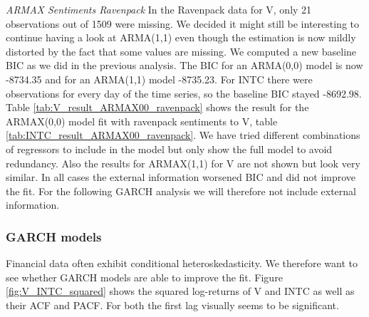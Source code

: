 \textit{ARMAX Sentiments Ravenpack}
In the Ravenpack data for V, only 21 observations out of 1509 were missing. We decided it might still be interesting to continue having a look at ARMA(1,1) even though the estimation is now mildly distorted by the fact that some values are missing. We computed a new baseline BIC as we did in the previous analysis. The BIC for an ARMA(0,0) model is now -8734.35 and for an ARMA(1,1) model -8735.23. For INTC there were observations for every day of the time series, so the baseline BIC stayed -8692.98. Table \ref{tab:V_result_ARMAX00_ravenpack} shows the result for the ARMAX(0,0) model fit with ravenpack sentiments to V, table \ref{tab:INTC_result_ARMAX00_ravenpack}. We have tried different combinations of regressors to include in the model but only show the full model to avoid redundancy. Also the results for ARMAX(1,1) for V are not shown but look very similar. In all cases the external information worsened BIC and did not improve the fit. For the following GARCH analysis we will therefore not include external information. 

\begin{table}[h]
    \centering
    
    \caption{}
    \label{tab:V_result_ARMAX00_ravenpack}
\end{table}{}

\begin{table}[h]
    \centering
    
    \caption{}
    \label{tab:V_result_ARMAX00_sentiment}
\end{table}{}

\begin{table}[h]
    \centering
    
    \caption{}
    \label{tab:INTC_result_ARMAX00_ravenpack}
\end{table}{}

\subsubsection{GARCH models}
Financial data often exhibit conditional heteroskedasticity. We therefore want to see whether GARCH models are able to improve the fit. Figure \ref{fig:V_INTC_squared} shows the squared log-returns of V and INTC as well as their ACF and PACF. For both the first lag visually seems to be significant. 

